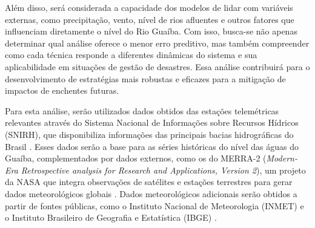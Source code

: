Além disso, será considerada a capacidade dos modelos de lidar com variáveis externas, como precipitação, vento, nível
de rios afluentes e outros fatores que influenciam diretamente o nível do Rio Guaíba. Com isso, busca-se não apenas
determinar qual análise oferece o menor erro preditivo, mas também compreender como cada técnica responde a diferentes
dinâmicas do sistema e sua aplicabilidade em situações de gestão de desastres. Essa análise contribuirá para o
desenvolvimento de estratégias mais robustas e eficazes para a mitigação de impactos de enchentes futuras.

Para esta análise, serão utilizados dados  obtidos das estações telemétricas relevantes através do Sistema Nacional de
Informações sobre Recursos Hídricos (SNIRH), que disponibiliza informações das principais bacias hidrográficas do Brasil
\cite{snirh}. Esses dados serão a base para as séries históricas do nível das águas do Guaíba, complementados por dados
externos, como os do MERRA-2 (\textit{Modern-Era Retrospective analysis for Research and Applications, Version 2}), um
projeto da NASA que integra observações de satélites e estações terrestres para gerar dados meteorológicos globais
\cite{nasa}. Dados meteorológicos adicionais serão obtidos a partir de fontes públicas, como o Instituto Nacional de
Meteorologia (INMET) e o Instituto Brasileiro de Geografia e Estatística (IBGE) \cite{inmet, ibge}.